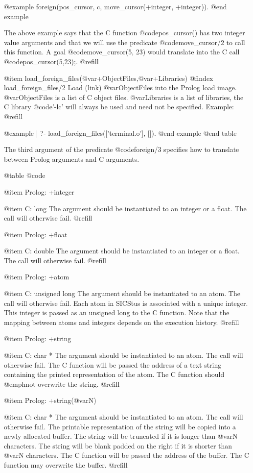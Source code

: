 @example
foreign(pos_cursor, c, move_cursor(+integer, +integer)).
@end example

The above example says that the C function @code{pos_cursor()} has two
integer value arguments and that we will use the predicate
@code{move_cursor/2} to call this function.  A goal @code{move_cursor(5, 23)}
would translate into the C call @code{pos_cursor(5,23);}. @refill

@item load_foreign_files(@var{+ObjectFiles},@var{+Libraries})
@findex load_foreign_files/2
Load (link) @var{ObjectFiles} into the Prolog load image. @var{ObjectFiles}
is a list of C object files. @var{Libraries} is a list of libraries, the C
library @code{'-lc'} will always be used and need not be specified.
Example: @refill

@example
| ?- load_foreign_files(['terminal.o'], []).
@end example
@end table

The third argument of the predicate @code{foreign/3} specifies how to translate
between Prolog arguments and C arguments.

@table @code

@item Prolog: +integer

@item C:      long
The argument should be instantiated to an integer or a float.
The call will otherwise fail. @refill

@item Prolog: +float

@item C:      double
The argument should be instantiated to an integer or a float.
The call will otherwise fail. @refill

@item Prolog: +atom

@item C:      unsigned long
The argument should be instantiated to an atom.  The call will otherwise fail.
Each atom in SICStus is associated with a unique integer.  This integer is
passed as an unsigned long to the C function.  Note that the mapping between
atoms and integers depends on the execution history. @refill

@item Prolog: +string

@item C:      char *
The argument should be instantiated to an atom.  The call will otherwise fail.
The C function will be passed the address of a text string containing
the printed representation of the atom.  The C function should @emph{not}
overwrite the string. @refill

@item Prolog: +string(@var{N})

@item C:      char *
The argument should be instantiated to an atom.  The call will otherwise
fail.  The printable representation of the string will be copied into a
newly allocated buffer.  The string will be truncated if it is longer than
@var{N} characters.  The string will be blank padded on the right if it is
shorter than @var{N} characters.  The C function will be passed the address
of the buffer.  The C function may overwrite the buffer. @refill

